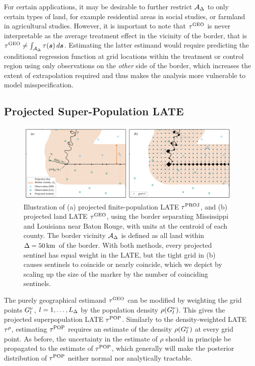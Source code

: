 	For certain applications, it may be desirable to further restrict \(\mathcal{A}_\Delta\) to only certain types of land, for example residential areas in social studies, or farmland in agricultural studies.
However, it is important to note that \(\tau^{\mathrm{GEO}}\) is never interpretable as the average treatment effect in the vicinity of the border, that is \(\tau^{\mathrm{GEO}} \neq \int_{\mathcal{A}_\Delta} \tau(\bm{s}) \mathop{d \bm{s}}\).
Estimating the latter estimand would require predicting the conditional regression function at grid locations within the treatment or control region using only observations on the \emph{other} side of the border, which increases the extent of extrapolation required and thus makes the analysis more vulnerable to model misspecification.

\subsection{Projected Super-Population LATE}

\begin{figure}[tb]
    \centering
    \includegraphics[width=\textwidth]{figures/mississippi_projection_methods.png}
    \caption{
		\label{fig:mississippi_projection_methods}
        Illustration of (a) projected finite-population LATE \(\tau^{\mathrm{PROJ}}\), and (b) projected land LATE \(\tau^{\mathrm{GEO}}\), using the border separating Mississippi and Louisiana near Baton Rouge, with units at the centroid of each county.
        The border vicinity \(\mathcal{A}_\Delta\) is defined as all land within \(\Delta=50\,\mathrm{km}\) of the border.
    With both methods, every projected sentinel has equal weight in the LATE, but the tight grid in (b) causes sentinels to coincide or nearly coincide, which we depict by scaling up the size of the marker by the number of coinciding sentinels.}
\end{figure}

	The purely geographical estimand \(\tau^{\mathrm{GEO}}\) can be modified by weighting the grid points \(G^\nu_l\), \(l=1,\dotsc,L_\Delta\) by the population density \(\rho(G^\nu_l)\).
This gives the projected superpopulation LATE \(\tau^{\mathrm{POP}}\).
Similarly to the density-weighted LATE \(\tau^{\rho}\), estimating \(\tau^{\mathrm{POP}}\) requires an estimate of the density \(\rho(G^\nu_l)\) at every grid point.
As before, the uncertainty in the estimate of \(\rho\) should in principle be propagated to the estimate of \(\tau^{\mathrm{POP}}\), which generally will make the posterior distribution of \(\tau^{\mathrm{POP}}\) neither normal nor analytically tractable.

